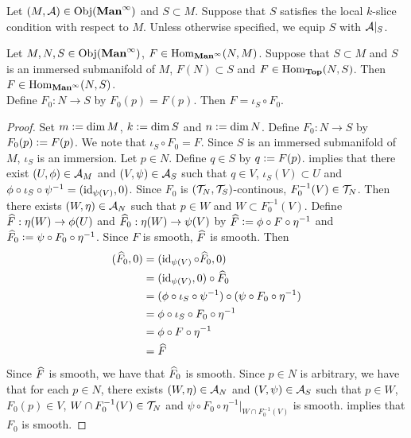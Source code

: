 \documentclass{book}
\begin{document}
	\begin{note}
		Let $(M, \mathcal{A}) \in \operatorname{Obj}(\operatorname*{\text{\textbf{Man}}^{\infty}})$ and $S \subset M$. Suppose that $S$ satisfies the local $k$-slice condition with respect to $M$. Unless otherwise specified, we equip $S$ with $\mathcal{A}|_S$.
	\end{note}

	\begin{ex} 
		Let $M, N, S \in \operatorname{Obj}(\operatorname*{\text{\textbf{Man}}^{\infty}})$, $F \in \operatorname{Hom}_{\operatorname*{\text{\textbf{Man}}^{\infty}}}(N, M)$. Suppose that $S \subset M$ and $S$ is an immersed submanifold of $M$, $F(N) \subset S$ and $F \in \operatorname{Hom}_{\operatorname*{\text{\textbf{Top}}}}(N, S)$. Then $F \in \operatorname{Hom}_{\operatorname*{\text{\textbf{Man}}^{\infty}}}(N, S)$. \\
		 Define $F_0:N \rightarrow S$ by $F_0(p) = F(p)$. Then $F = \iota_S \circ F_0$.
	\end{ex}

	\begin{proof}
		Set $m \vcentcolon= \dim M$, $k \vcentcolon= \dim S$ and $n \vcentcolon= \dim N$. Define $F_0: N \rightarrow S$ by $F_0(p) \vcentcolon= F(p)$. We note that $\iota_S \circ F_0 = F$. Since $S$ is an immersed submanifold of $M$, $\iota_S$ is an immersion. Let $p \in N$. Define $q \in S$ by $q \vcentcolon= F(p)$.  implies that there exist $(U, \phi) \in \mathcal{A}_M$ and $(V, \psi) \in \mathcal{A}_S$ such that $q \in V$, $\iota_S(V) \subset U$ and $\phi \circ \iota_S \circ \psi^{-1} = (\operatorname{id}_{\psi(V)}, 0)$. Since $F_0$ is $(\mathcal{T}_N, \mathcal{T}_S)$-continous, $F_0^{-1}(V) \in \mathcal{T}_N$. Then there exists $(W, \eta) \in \mathcal{A}_N$ such that $p \in W$ and $W \subset F_0^{-1}(V)$. Define $\widehat{F}: \eta(W) \rightarrow \phi(U)$ and $\widehat{F}_0: \eta(W) \rightarrow \psi(V)$ by $\widehat{F} \vcentcolon= \phi \circ F \circ \eta^{-1}$ and $\widehat{F}_0 \vcentcolon= \psi \circ F_0 \circ \eta^{-1}$. Since $F$ is smooth, $\widehat{F}$ is smooth. Then 
		\begin{align*}
			(\widehat{F}_0, 0)
			& = (\operatorname{id}_{\psi(V)} \circ \widehat{F}_0, 0) \\
			& = (\operatorname{id}_{\psi(V)}, 0) \circ \widehat{F}_0 \\
			& = (\phi \circ \iota_S \circ \psi^{-1}) \circ (\psi \circ F_0 \circ \eta^{-1}) \\
			& = \phi \circ \iota_S \circ F_0 \circ \eta^{-1} \\
			& = \phi \circ F \circ \eta^{-1} \\
			& = \widehat{F} 
		\end{align*}
		Since $\widehat{F}$ is smooth, we have that $\widehat{F}_0$ is smooth. Since $p \in N$ is arbitrary, we have that for each $p \in N$, there exists $(W, \eta) \in \mathcal{A}_N$ and $(V, \psi) \in \mathcal{A}_S$ such that $p \in W$, $F_0(p) \in V$, $W \cap F_0^{-1}(V) \in \mathcal{T}_N$ and $\psi \circ F_0 \circ \eta^{-1}|_{W \cap F_0^{-1}(V)}$ is smooth.  implies that $F_0$ is smooth. 
	\end{proof}
\end{document}
